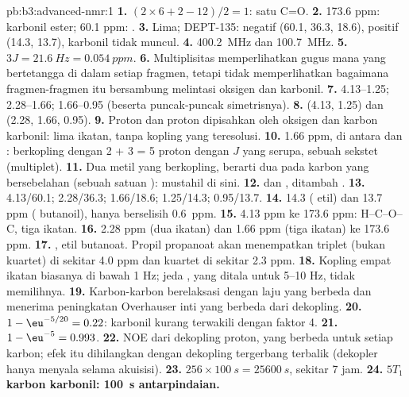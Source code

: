 \begin{solution}{pb:b3:advanced-nmr:1}
\textbf{1.} $(2 \times 6 + 2 - 12)/2 = 1$: satu C=O.
\textbf{2.} 173.6 ppm: karbonil ester; 60.1 ppm: .
\textbf{3.} Lima; DEPT-135:  negatif (60.1, 36.3, 18.6),  positif
(14.3, 13.7), karbonil tidak muncul.
\textbf{4.} \qty{400.2}{MHz} dan \qty{100.7}{MHz}.
\textbf{5.} $3J = \qty{21.6}{Hz} = \qty{0.054}{ppm}$.
\textbf{6.} Multiplisitas memperlihatkan gugus mana yang bertetangga di dalam
setiap fragmen, tetapi tidak memperlihatkan bagaimana fragmen-fragmen itu
bersambung melintasi oksigen dan karbonil.
\textbf{7.} 4.13--1.25; 2.28--1.66; 1.66--0.95 (beserta puncak-puncak
simetrisnya).
\textbf{8.}  (4.13, 1.25) dan  (2.28, 1.66, 0.95).
\textbf{9.} Proton  dan proton  dipisahkan oleh oksigen dan
karbon karbonil: lima ikatan, tanpa kopling yang teresolusi.
\textbf{10.} 1.66 ppm, di antara  dan : berkopling dengan
2 + 3 = 5 proton dengan $J$ yang serupa, sebuah sekstet (multiplet).
\textbf{11.} Dua metil yang berkopling, berarti dua  pada karbon yang
bersebelahan (sebuah satuan ): mustahil di sini.
\textbf{12.}  dan , ditambah .
\textbf{13.} 4.13/60.1; 2.28/36.3; 1.66/18.6; 1.25/14.3; 0.95/13.7.
\textbf{14.} 14.3 ( etil) dan 13.7 ppm ( butanoil), hanya
berselisih \qty{0.6}{ppm}.
\textbf{15.} 4.13 ppm ke 173.6 ppm: H--C--O--C, tiga ikatan.
\textbf{16.} 2.28 ppm (dua ikatan) dan 1.66 ppm (tiga ikatan) ke 173.6 ppm.
\textbf{17.} , etil butanoat. Propil propanoat akan
menempatkan triplet  (bukan kuartet) di sekitar 4.0 ppm dan kuartet di
sekitar 2.3 ppm.
\textbf{18.} Kopling empat ikatan biasanya di bawah 1 Hz; jeda , yang
ditala untuk 5--10 Hz, tidak memilihnya.
\textbf{19.} Karbon-karbon berelaksasi dengan laju yang berbeda dan menerima
peningkatan Overhauser inti yang berbeda dari dekopling.
\textbf{20.} $1 - \eu^{-5/20} = 0.22$: karbonil kurang terwakili dengan faktor 4.
\textbf{21.} $1 - \eu^{-5} = 0.993$.
\textbf{22.} NOE dari dekopling proton, yang berbeda untuk setiap karbon; efek
itu dihilangkan dengan dekopling tergerbang terbalik (dekopler hanya menyala
selama akuisisi).
\textbf{23.} $256 \times \qty{100}{s} = \qty{25600}{s}$, sekitar 7 jam.
\textbf{24.} \textbf{$5T_1$ karbon karbonil: \qty{100}{s} antarpindaian.}
\end{solution}

